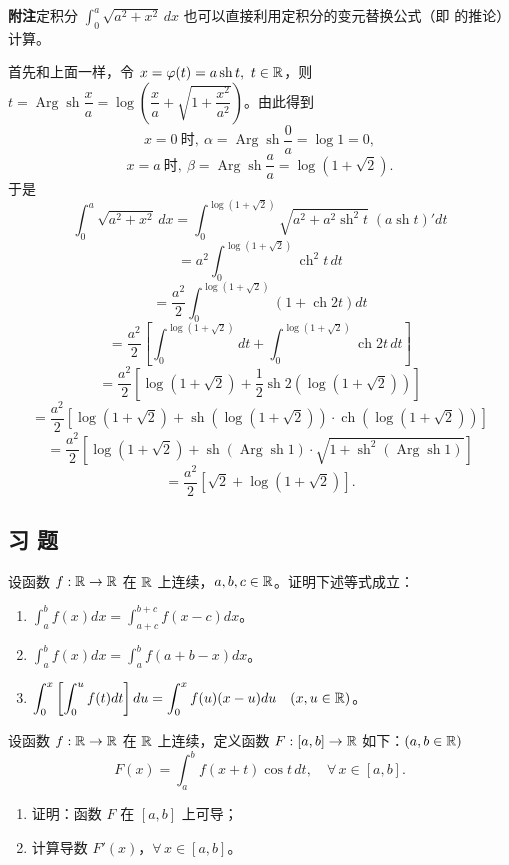 \textbf{附注}\quad 定积分 \(\displaystyle\int_0^a\sqrt{a^2+x^2}\,dx\) 也可以直接利用定积分的变元替换公式（即 的推论）计算。

首先和上面一样，令 \(x=\varphi(t)=a\operatorname{sh}t,\ t\in\R\)，则 \(t=\operatorname{Arg}\operatorname{sh}\dfrac xa=\log\left(\dfrac xa+\sqrt{1+\dfrac{x^2}{a^2}}\right)\)。由此得到
\[
x=0\ \text{时},\ \alpha=\operatorname{Arg}\operatorname{sh}\frac0a=\log1=0,
\]
\[
x=a\ \text{时},\ \beta=\operatorname{Arg}\operatorname{sh}\frac aa=\log(1+\sqrt2).
\]
于是
\[
\int_0^a\sqrt{a^2+x^2}\,dx=\int_0^{\log(1+\sqrt2)}\sqrt{a^2+a^2\operatorname{sh}^2t}\;(a\operatorname{sh}t)'dt
\]
\[
=a^2\int_0^{\log(1+\sqrt2)}\operatorname{ch}^2t\,dt
\]
\[
=\frac{a^2}{2}\int_0^{\log(1+\sqrt2)}(1+\operatorname{ch}2t)dt
\]
\[
=\frac{a^2}{2}\left[\int_0^{\log(1+\sqrt2)}dt+\int_0^{\log(1+\sqrt2)}\operatorname{ch}2t\,dt\right]
\]
\[
=\frac{a^2}{2}\left[\log(1+\sqrt2)+\frac12\operatorname{sh}2(\log(1+\sqrt2))\right]
\]
\[
=\frac{a^2}{2}\left[\log(1+\sqrt2)+\operatorname{sh}(\log(1+\sqrt2))\cdot\operatorname{ch}(\log(1+\sqrt2))\right]
\]
\[
=\frac{a^2}{2}\left[\log(1+\sqrt2)+\operatorname{sh}(\operatorname{Arg}\operatorname{sh}1)\cdot\sqrt{1+\operatorname{sh}^2(\operatorname{Arg}\operatorname{sh}1)}\right]
\]
\[
=\frac{a^2}{2}\left[\sqrt2+\log(1+\sqrt2)\right].
\]

\subsection*{习 题}

\begin{exercise}
	\item 设函数 \(f:\mathbb{R}\to\mathbb{R}\) 在 \(\mathbb{R}\) 上连续，\(a,b,c\in\mathbb{R}\)。证明下述等式成立：
	\begin{enumerate}[label=\arabic*)]
		\item \(\displaystyle\int_a^b f(x)dx=\int_{a+c}^{b+c}f(x-c)dx\)。
		\item \(\displaystyle\int_a^b f(x)dx=\int_a^b f(a+b-x)dx\)。
		\item \(\displaystyle\int_0^x\left[\int_0^u f(t)dt\right]du=\int_0^x f(u)(x-u)du\quad(x,u\in\mathbb{R})\)。
	\end{enumerate}
\end{exercise}

\begin{exercise}
	\item 设函数 \(f:\mathbb{R}\to\mathbb{R}\) 在 \(\mathbb{R}\) 上连续，定义函数 \(F:[a,b]\to\mathbb{R}\) 如下：\((a,b\in\mathbb{R})\)
	\[
	F(x)=\int_a^b f(x+t)\cos t\,dt,\quad\forall\,x\in[a,b].
	\]
	\begin{enumerate}[label=\arabic*)]
		\item 证明：函数 \(F\) 在 \([a,b]\) 上可导；
		\item 计算导数 \(F'(x)\)，\(\forall\,x\in[a,b]\)。
	\end{enumerate}
\end{exercise}

